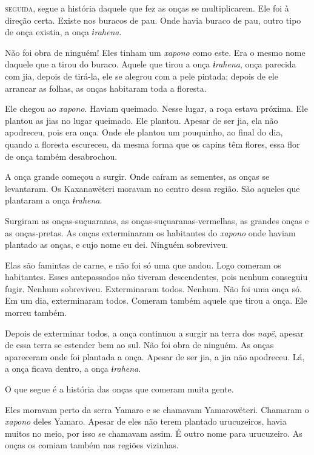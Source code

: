  \textsc{seguida}, segue a história daquele que fez as onças se multiplicarem.
Ele foi à direção certa. Existe nos buracos de pau. Onde havia buraco de
pau, outro tipo de onça existia, a onça \textit{ɨrahena}.

Não foi obra de ninguém! Eles tinham um \textit{xapono} como este. Era o mesmo nome
daquele que a tirou do buraco. Aquele que tirou a onça \textit{ɨrahena},
onça parecida com jia, depois de tirá-la, ele se alegrou com a pele
pintada; depois de ele arrancar as folhas, as onças habitaram toda a
floresta. 

Ele chegou ao \textit{xapono}. Haviam queimado. Nesse lugar, a roça estava
próxima. Ele plantou as jias no lugar queimado. Ele plantou. Apesar de
ser jia, ela não apodreceu, pois era onça. Onde ele plantou um pouquinho,
ao final do dia, quando a floresta escureceu, da mesma forma que os
capins têm flores, essa flor de onça também desabrochou. 

A onça grande começou a surgir. Onde caíram as sementes, as onças se
levantaram. Os Kaxanawëteri moravam no centro dessa região. São aqueles
que plantaram a onça \textit{ɨrahena}. 

Surgiram as onças-suçuaranas, as onças-suçuaranas-vermelhas, as grandes
onças e as onças-pretas. As onças exterminaram os habitantes do \textit{xapono}
onde haviam plantado as onças, e cujo nome eu dei. Ninguém sobreviveu. 

Elas são famintas de carne, e não foi só uma que andou. Logo comeram os
habitantes. Esses antepassados não tiveram descendentes, pois nenhum
conseguiu fugir. Nenhum sobreviveu. Exterminaram todos. Nenhum. Não foi uma onça só. Em um dia, exterminaram todos. Comeram também aquele que tirou
a onça. Ele morreu também.

Depois de exterminar todos, a onça continuou a surgir na terra
 dos \textit{napë}, apesar de essa terra se estender bem ao sul. Não foi obra
 de ninguém. As onças apareceram onde foi plantada a onça. Apesar de ser
 jia, a jia não apodreceu. Lá, a onça ficava dentro, a
 onça \textit{ɨrahena}.

O que segue é a história das onças que comeram muita gente. 

Eles moravam perto da serra Yamaro e se chamavam Yamarowëteri. Chamaram
o \textit{xapono} deles Yamaro. Apesar de eles não terem plantado urucuzeiros,
havia muitos no meio, por isso se chamavam assim. É outro nome para
urucuzeiro. As onças os comiam também nas regiões vizinhas. 

